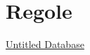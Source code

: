 \section{Regole}\label{regole}

\href{Untitled\%20Database\%203f759c450f8140b39ad7750043638472.csv}{Untitled
Database}
